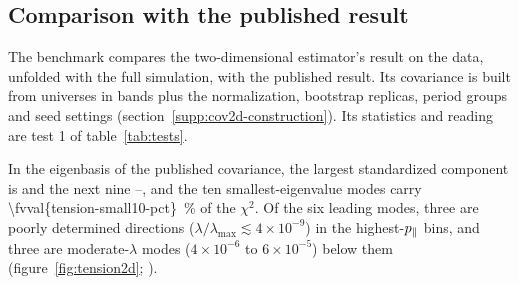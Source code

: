 \subsection{Comparison with the published result}
\label{supp:cov2d-bench}
The benchmark compares the two-dimensional estimator's result on the data, unfolded with the full simulation, with the published result. Its covariance is built from  universes in  bands plus the normalization,  bootstrap replicas,  period groups and  seed settings (section~\ref{supp:cov2d-construction}). Its statistics and reading are test 1 of table~\ref{tab:tests}.


In the eigenbasis of the published covariance, the largest standardized component is  and the next nine --, and the ten smallest-eigenvalue modes carry \SI{\fvval{tension-small10-pct}}{\percent} of the $\chi^{2}$. Of the six leading modes, three are poorly determined directions ($\lambda/\lambda_{\max}\lesssim4\times10^{-9}$) in the highest-$p_{\parallel}$ bins, and three are moderate-$\lambda$ modes ($4\times10^{-6}$ to $6\times10^{-5}$) below them (figure~\ref{fig:tension2d}; ).

